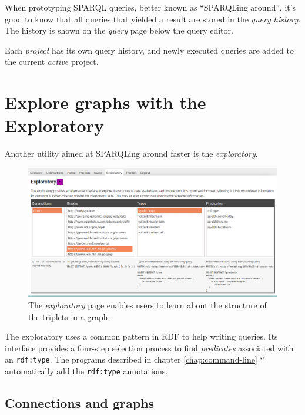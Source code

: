   When prototyping SPARQL queries, better known as ``SPARQLing around'', it's
  good to know that all queries that yielded a result are stored in the
  \emph{query history}.  The history is shown on the \emph{query} page below the
  query editor.

  Each \emph{project} has its own query history, and newly executed queries are
  added to the current \emph{active} project.

\section{Explore graphs with the Exploratory}

  Another utility aimed at SPARQLing around faster is the \emph{exploratory}.

  \begin{figure}[H]
    \begin{center}
      \includegraphics[width=1.0\textwidth]{figures/web-exploratory.png}
    \end{center}
    \caption{The \emph{exploratory} page enables users to learn about the
      structure of the triplets in a graph.}
    \label{fig:web-exploratory}
  \end{figure}

  The exploratory uses a common pattern in RDF to help writing queries.  Its
  interface provides a four-step selection process to find \emph{predicates}
  associated with an \texttt{rdf:type}.  The programs described in chapter
  \ref{chap:command-line} {\color{LinkGray}`'}
  automatically add the \texttt{rdf:type} annotations.

\subsection{Connections and graphs}

